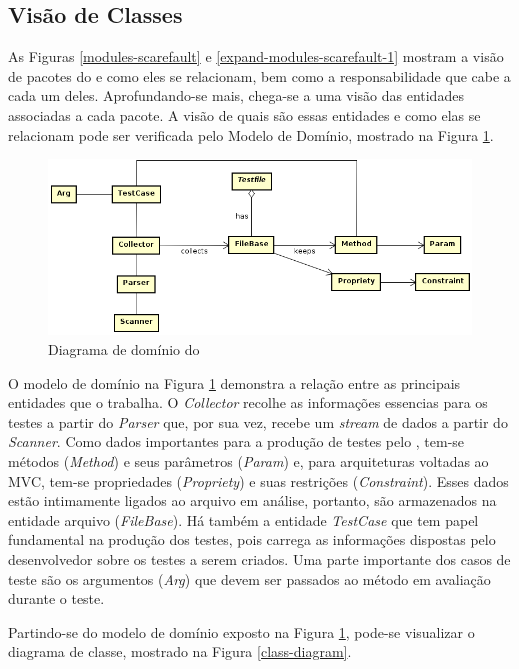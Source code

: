 \subsection{Visão de Classes}
As Figuras \ref{modules-scarefault} e \ref{expand-modules-scarefault-1} mostram
a visão de pacotes do \scarefault e como eles se relacionam, bem como a
responsabilidade que cabe a cada um deles. Aprofundando-se mais, chega-se a uma
visão das entidades associadas a cada pacote. A visão de quais são essas
entidades e como elas se relacionam pode ser verificada pelo Modelo de 
Domínio, mostrado na Figura \ref{domain-diagram}.
\begin{figure}[h]
  \centering
    \includegraphics[width=\textwidth]{figuras/domain-diagram.png}
    \caption{Diagrama de domínio do \scarefault}
    \label{domain-diagram}
\end{figure}
\FloatBarrier

O modelo de domínio na Figura \ref{domain-diagram} demonstra a relação
entre as principais entidades que o \framework trabalha. O \textit{Collector}
recolhe as  informações essencias para os testes a partir do
\textit{Parser} que, por sua vez, recebe um \textit{stream} de dados a partir
do \textit{Scanner}. Como dados importantes para a produção de testes pelo
\scarefault, tem-se métodos (\textit{Method}) e seus parâmetros (\textit{Param})
e, para arquiteturas voltadas ao MVC, tem-se propriedades (\textit{Propriety})
e suas restrições (\textit{Constraint}). Esses dados estão intimamente ligados
ao arquivo em análise, portanto, são armazenados na entidade arquivo (\textit{FileBase}).
Há também a entidade \textit{TestCase} que tem papel fundamental na produção
dos testes, pois carrega as informações dispostas pelo desenvolvedor sobre os
testes a serem criados. Uma parte importante dos casos de teste são os
argumentos (\textit{Arg}) que devem ser passados ao método em avaliação durante o
teste.

Partindo-se do modelo de domínio exposto na Figura \ref{domain-diagram}, pode-se
visualizar o diagrama de classe, mostrado na Figura \ref{class-diagram}.

